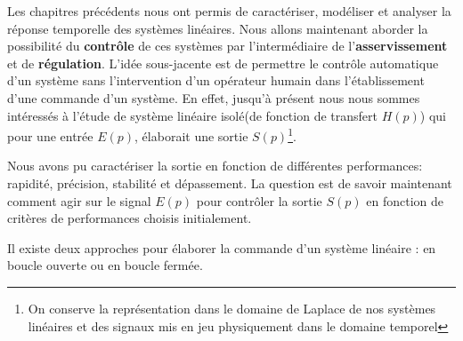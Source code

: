 Les chapitres précédents nous ont permis de caractériser, modéliser et
analyser la réponse temporelle des systèmes linéaires.
Nous allons maintenant aborder la possibilité du \textbf{contrôle} de ces 
systèmes par l'intermédiaire de l'\textbf{asservissement} et de 
\textbf{régulation}. 
L'idée sous-jacente est de permettre le contrôle automatique d'un système
sans l'intervention d'un opérateur humain dans l'établissement d'une commande
d'un système. 
En effet, jusqu'à présent nous nous sommes intéressés à l'étude de système 
linéaire \og isolé\fg (de fonction de transfert $H(p)$) 
qui pour une entrée $E(p)$, élaborait une sortie $S(p)$\footnote{On conserve la représentation
dans le domaine de Laplace de nos systèmes linéaires et des signaux mis en jeu physiquement dans le domaine temporel}.

\begin{center}
\end{center}

Nous avons pu caractériser la sortie en fonction de différentes 
performances: rapidité, précision, stabilité et dépassement. 
La question est de savoir maintenant comment agir sur le 
signal $E(p)$ pour contrôler la sortie $S(p)$ en fonction de critères
de performances choisis initialement.

Il existe deux approches pour élaborer la commande 
d'un système linéaire : en boucle ouverte ou en boucle fermée.

